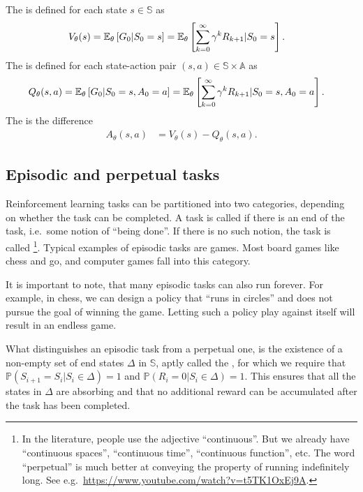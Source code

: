 \documentclass[a4paper,12pt]{amsart}
\newcommand{\stateSpace}{\mathbb S}
\newcommand{\coffinSpace}{\Delta}
\newcommand{\actionSpace}{\mathbb A}
\newcommand{\stateValueFunc}{V}
\newcommand{\actionValueFunc}{Q}
\newcommand{\advantageFunc}{A}
\newcommand{\discountFactor}{\gamma}
\newcommand{\prob}{\mathbb P}
\begin{document}
The  is defined for each state $s\in\stateSpace$ as
\begin{align}
    \stateValueFunc_{\theta}(s) &= \E_{\theta} \left[ G_0 | S_{0} = s \right] =
    \E_{\theta}\left[\sum_{k=0}^{\infty} \discountFactor^{k} R_{k+1} | 
        S_{0} = s \right].
    \label{def:state-value-function}
\end{align}
The  is defined for each state-action pair
$(s,a)\in\stateSpace\times\actionSpace$ as
\begin{align}
    \actionValueFunc_{\theta}(s,a) &= \E_{\theta} \left[ G_0 | S_0 = s, A_{0} = a \right] = 
    \E_{\theta}\left[\sum_{k=0}^{\infty} \discountFactor^{k} R_{k+1} | 
        S_0 = s, A_{0} = a \right].
    \label{def:action-value-function}
\end{align}
The  is the difference
\begin{align}
    \advantageFunc_{\theta}(s,a) &= V_{\theta}(s) - Q_{\theta}(s,a).
    \label{def:advantage-function}
\end{align}

\subsection{Episodic and perpetual tasks} 
Reinforcement learning tasks can be partitioned into two categories, depending
on whether the task can be completed. A task is called  if
there is an end of the task, i.e.\ some notion of ``being done''.
If there is no such notion, the task is called 
\footnote{In the literature, people use the adjective ``continuous''.
    But we already have ``continuous spaces'', ``continuous time'', ``continuous function'', etc.
    The word ``perpetual'' is much better at conveying the property 
    of running indefinitely long. 
    See e.g.\ \href{https://www.youtube.com/watch?v=t5TK1OxEj9A}{https://www.youtube.com/watch?v=t5TK1OxEj9A}.
}.
Typical examples of episodic tasks are games. Most board games like chess and
go, and computer games fall into this category.

It is important to note, that many episodic tasks can also run 
forever. For example, in chess, we can design a policy that ``runs in circles''
and does not pursue the goal of winning the game. Letting such a 
policy play against itself will result in an endless game.

What distinguishes an episodic task from a perpetual one, is the existence of
a non-empty set of end states $\coffinSpace$ in $\stateSpace$, aptly called the
, for which we require that $\prob\left( S_{i+1} = S_{i} |
S_{i} \in \coffinSpace \right) = 1$ and $\prob\left( R_{i} = 0 | S_{i} \in
\coffinSpace \right) = 1$. This ensures that all the states in $\coffinSpace$
are absorbing and that no additional reward can be accumulated after the task
has been completed.
\end{document}
